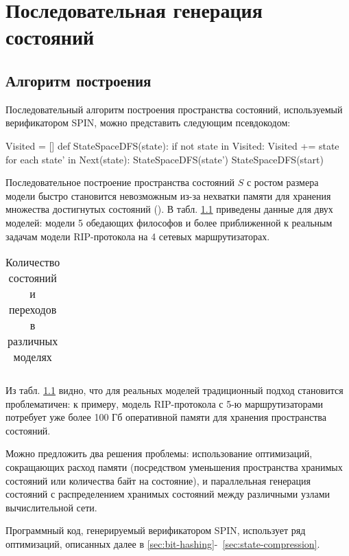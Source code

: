\chapter{Последовательная генерация состояний}
\label{sec:seq-statespace}

\section{Алгоритм построения}
\label{sec:seq-algo}

Последовательный алгоритм построения пространства состояний,
используемый верификатором SPIN, можно представить следующим
псевдокодом:

\begin{CodeBlock}
Visited = []
def StateSpaceDFS(state):
    if not state in Visited:
        Visited += state
        for each state' in Next(state):
            StateSpaceDFS(state')
StateSpaceDFS(start)
\end{CodeBlock}

Последовательное построение пространства состояний $S$ с ростом
размера модели быстро становится невозможным из-за нехватки памяти для
хранения множества достигнутых состояний (). В
табл. \ref{tab:models-statecount} приведены данные для двух моделей:
модели 5 обедающих философов и более приближенной к реальным задачам
модели RIP-протокола на 4 сетевых маршрутизаторах.

\begin{table}
  \centering
  \begin{tabular}{r|l}
  \end{tabular}
  \caption{Количество состояний и переходов в различных моделях}
\label{tab:models-statecount}
\end{table}

Из табл. \ref{tab:models-statecount} видно, что для реальных моделей
традиционный подход становится проблематичен: к примеру, модель
RIP-протокола с 5-ю маршрутизаторами потребует уже более 100 Гб
оперативной памяти для хранения пространства состояний. 

Можно предложить два решения проблемы: использование оптимизаций,
сокращающих расход памяти (посредством уменьшения пространства
хранимых состояний или количества байт на состояние), и параллельная
генерация состояний с распределением хранимых состояний между
различными узлами вычислительной сети.

Программный код, генерируемый верификатором SPIN, использует ряд
оптимизаций, описанных далее в \ref{sec:bit-hashing}-~\ref{sec:state-compression}.

